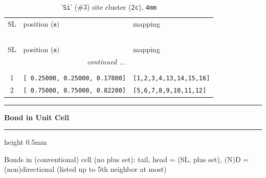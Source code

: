 \documentclass[fleqn,10pt,landscape]{jsarticle}
\begin{document}
\renewcommand{\arraystretch}{1.6}
\begin{longtable}[l]{cll}
\captionsetup{justification=raggedright, singlelinecheck=off}
\caption{'\texttt{Si}' (\#3) site cluster (\texttt{2c}), \texttt{4mm}}
 \\
 \hline \hline
SL & position ($\bm{s})$ & mapping \\ \hline \endfirsthead

\multicolumn{2}{l}{\tablename\ \thetable{}} \\
 \hline \hline
SL & position ($\bm{s})$ & mapping \\ \hline \endhead

 \hline \hline
\multicolumn{2}{r}{\footnotesize\it continued ...} \\ \endfoot

 \hline \hline
\multicolumn{2}{r}{} \\ \endlastfoot

1 & \texttt{[ 0.25000, 0.25000, 0.17800]} & \texttt{[1,2,3,4,13,14,15,16]} \\ \hline
2 & \texttt{[ 0.75000, 0.75000, 0.82200]} & \texttt{[5,6,7,8,9,10,11,12]} \\
\end{longtable}
\vspace{5mm}
\noindent \rule[0.5mm]{5mm}{0.5mm}\hspace{3mm}\textbf{Bond in Unit Cell}\hspace{3mm}\leaders\hrule height 0.5mm\hfill\kern0pt
\vspace{3mm}

\noindent Bonds in (conventional) cell (no plus set): tail, head = (SL, plus set), (N)D = (non)directional (listed up to 5th neighbor at most)
\end{document}
